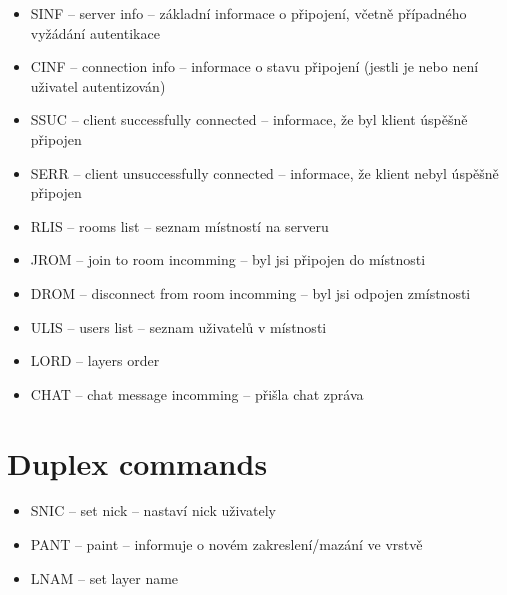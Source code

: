 \begin{itemize}
    \item SINF -- server info -- základní informace o připojení, včetně případného vyžádání autentikace
    \item CINF -- connection info -- informace o stavu připojení (jestli je nebo není uživatel autentizován)
    \item SSUC -- client successfully connected -- informace, že byl klient úspěšně připojen
    \item SERR -- client unsuccessfully connected -- informace, že klient nebyl úspěšně připojen
    \item RLIS -- rooms list -- seznam místností na serveru
    \item JROM -- join to room incomming -- byl jsi připojen do místnosti
    \item DROM -- disconnect from room incomming -- byl jsi odpojen zmístnosti
    \item ULIS -- users list -- seznam uživatelů v místnosti
	\item LORD -- layers order
	\item CHAT -- chat message incomming -- přišla chat zpráva
\end{itemize}

\section{Duplex commands}

\begin{itemize}
    \item SNIC -- set nick -- nastaví nick uživately

	\item PANT -- paint -- informuje o novém zakreslení/mazání ve vrstvě 
	\item LNAM -- set layer name
\end{itemize}




%


